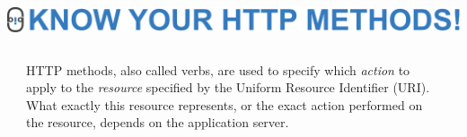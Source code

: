 \documentclass[final,table]{beamer}
\begin{document}
  \begin{frame}{}
    \begin{minipage}{\textwidth}
      \centering
      \includegraphics[]{./title-methods.pdf}
    \end{minipage}
    
    \vspace{0.5in}

    \begin{columns}
      \begin{column}{0.1\textwidth}
      \end{column}
      \begin{column}{0.8\textwidth}
        \begin{block}{}
          \huge
            HTTP methods, also called verbs, are used to specify which \emph{action}
            to apply to the  \emph{resource} specified by the Uniform Resource
            Identifier (URI). What exactly this resource represents, or the exact
            action performed on the resource, depends on the application server.
          \normalsize
        \end{block}
      \end{column}
      \begin{column}{0.1\textwidth}
      \end{column}
    \end{columns}

    \vspace{0.5in}


\end{frame}
\end{document}
